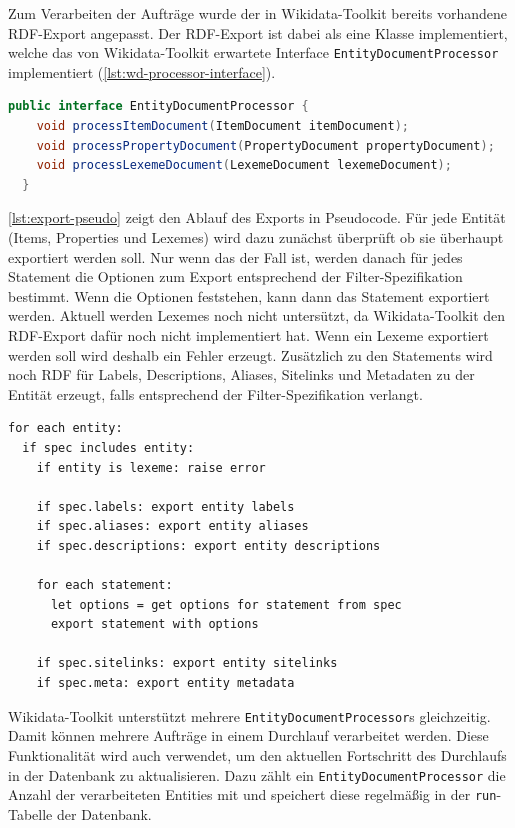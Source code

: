 Zum Verarbeiten der Aufträge wurde der in Wikidata-Toolkit bereits vorhandene RDF-Export angepasst.
Der RDF-Export ist dabei als eine Klasse implementiert, welche das von Wikidata-Toolkit erwartete Interface \verb|EntityDocumentProcessor| implementiert (\cref{lst:wd-processor-interface}).

\begin{lstlisting}[language=Java, caption={EntityDocumentProcessor Interface}, label={lst:wd-processor-interface}]
  public interface EntityDocumentProcessor {
    void processItemDocument(ItemDocument itemDocument);
    void processPropertyDocument(PropertyDocument propertyDocument);
    void processLexemeDocument(LexemeDocument lexemeDocument);
  }
\end{lstlisting}


\cref{lst:export-pseudo} zeigt den Ablauf des Exports in Pseudocode.
Für jede Entität (Items, Properties und Lexemes) wird dazu zunächst überprüft ob sie überhaupt exportiert werden soll.
Nur wenn das der Fall ist, werden danach für jedes Statement die Optionen zum Export entsprechend der Filter-Spezifikation bestimmt. 
Wenn die Optionen feststehen, kann dann das Statement exportiert werden.
Aktuell werden Lexemes noch nicht untersützt, da Wikidata-Toolkit den RDF-Export dafür noch nicht implementiert hat.
Wenn ein Lexeme exportiert werden soll wird deshalb ein Fehler erzeugt.
Zusätzlich zu den Statements wird noch RDF für Labels, Descriptions, Aliases, Sitelinks und Metadaten zu der Entität erzeugt, falls entsprechend der Filter-Spezifikation verlangt.

\begin{lstlisting}[keywords={for,each,if,let}, caption={Export Pseudocode}, label={lst:export-pseudo}]
for each entity:
  if spec includes entity:
    if entity is lexeme: raise error
  
    if spec.labels: export entity labels
    if spec.aliases: export entity aliases
    if spec.descriptions: export entity descriptions

    for each statement:
      let options = get options for statement from spec
      export statement with options

    if spec.sitelinks: export entity sitelinks
    if spec.meta: export entity metadata
\end{lstlisting}

Wikidata-Toolkit unterstützt mehrere \verb|EntityDocumentProcessor|s gleichzeitig.
Damit können mehrere Aufträge in einem Durchlauf verarbeitet werden. 
Diese Funktionalität wird auch verwendet, um den aktuellen Fortschritt des Durchlaufs in der Datenbank zu aktualisieren.
Dazu zählt ein \verb|EntityDocumentProcessor| die Anzahl der verarbeiteten Entities mit und speichert diese regelmäßig in der \verb|run|-Tabelle der Datenbank.

